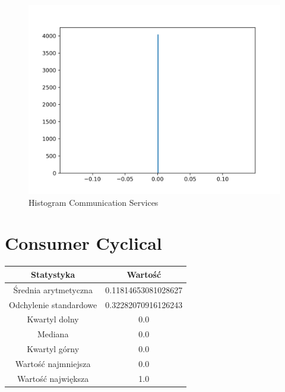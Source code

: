 \documentclass{article}
\begin{document}
\begin{figure}[h!]
    \includegraphics[width=\linewidth]{variables/Communication Services.png}
    \caption{Histogram Communication Services }
\end{figure}\section{ Consumer Cyclical }

\begin{center}
    \begin{tabular}{|c | c|} 
    \hline
    Statystyka & Wartość \\
    \hline\hline
    Średnia arytmetyczna & 0.11814653081028627 \\ 
    \hline
    Odchylenie standardowe & 0.32282070916126243 \\
    \hline
    Kwartyl dolny & 0.0 \\
    \hline
    Mediana & 0.0 \\
    \hline
    Kwartyl górny & 0.0 \\
    \hline
    Wartość najmniejsza & 0.0 \\
    \hline
    Wartość największa & 1.0 \\
    \hline
   \end{tabular}
\end{center}
\end{document}
